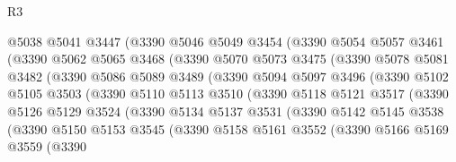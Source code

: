 \begin{lexlean}{R3}
\begin{coremodule}
                @5038
                @5041
                @3447
                (@3390
                  @5046
                  @5049
                  @3454
                  (@3390
                    @5054
                    @5057
                    @3461
                    (@3390
                      @5062
                      @5065
                      @3468
                      (@3390
                        @5070
                        @5073
                        @3475
                        (@3390
                          @5078
                          @5081
                          @3482
                          (@3390
                            @5086
                            @5089
                            @3489
                            (@3390
                              @5094
                              @5097
                              @3496
                              (@3390
                                @5102
                                @5105
                                @3503
                                (@3390
                                  @5110
                                  @5113
                                  @3510
                                  (@3390
                                    @5118
                                    @5121
                                    @3517
                                    (@3390
                                      @5126
                                      @5129
                                      @3524
                                      (@3390
                                        @5134
                                        @5137
                                        @3531
                                        (@3390
                                          @5142
                                          @5145
                                          @3538
                                          (@3390
                                            @5150
                                            @5153
                                            @3545
                                            (@3390
                                              @5158
                                              @5161
                                              @3552
                                              (@3390
                                                @5166
                                                @5169
                                                @3559
                                                (@3390

\end{coremodule}
\end{lexlean}
